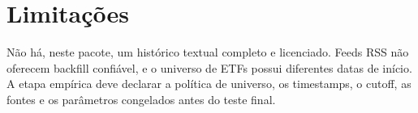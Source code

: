 \section{Limitações}
Não há, neste pacote, um histórico textual completo e licenciado. Feeds RSS não
oferecem backfill confiável, e o universo de ETFs possui diferentes datas de
início. A etapa empírica deve declarar a política de universo, os timestamps,
o cutoff, as fontes e os parâmetros congelados antes do teste final.
